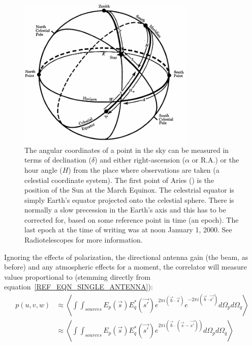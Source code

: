 \documentclass[a4paper,10pt]{report}
\begin{document}
\begin{figure}[h]
 \begin{mdframed}
 \centering
 \includegraphics[width=0.75\textwidth]{images/equatorial_coords.png}
 \caption[Equatorial and alt-azimuth coordinate system]{The angular coordinates of a point in the sky can be measured in terms of declination ($\delta$) and either right-ascension ($\alpha$ or R.A.) or the hour angle ($H$) from the place
 where observations are taken (a celestial coordinate system). The first point of Aries (\Aries) is the position of the Sun at the March Equinox. The celestrial equator is simply Earth's equator projected onto the celestial sphere. There is normally a slow precession in the Earth's
 axis and this has to be corrected for, based on some reference point in time (an epoch). The last epoch at the time of writing was at noon January 1, 2000. See Radiotelescopes \cite[Appendix 4]{christiansenradiotelescopes} for more information.}
  \label{fig_celestrial_coords}
 \end{mdframed}
\end{figure}

Ignoring the effects of polarization, the directional antenna gain (the beam, as before) and any atmospheric effects
for a moment, the correlator will measure values proportional to (stemming directly from equation~\ref{REF_EQN_SINGLE_ANTENNA}):
\begin{equation*}
  \begin{split}
    p(u,v,w) &\approx \left<\int\int_{sources}{E_p(\vec{s})E_q^*(\vec{s'})e^{2\pi i(\vec{b}\cdot\vec{s})}e^{-2\pi i(\vec{b}\cdot\vec{s'})}d\Omega_pd\Omega_q}\right>\\
	     &\approx \left<\int\int_{sources}{E_p(\vec{s})E_q^*(\vec{s'})e^{2\pi i(\vec{b}\cdot(\vec{s}-\vec{s'}))}d\Omega_pd\Omega_q}\right>\\
  \end{split}
\end{equation*}
\end{document}

